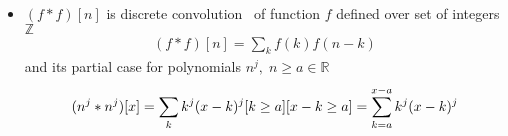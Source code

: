 \begin{itemize}
    \item $(f\ast f)[n]$ is discrete convolution~\cite{damelin_discrete_convolution} of function $f$ defined over set of integers $\mathbb{Z}$
    \begin{align*}
    (f\ast f)[n]
        = \sum_{k} f(k) f(n-k)
    \end{align*}
    and its partial case for polynomials $n^j, \; n\geq a \in \mathbb{R}$
    \begin{align*}
        (n \sp{j} \ast n \sp{j}) [x] =\sum_{k} k^j (x-k)^j [k\geq a][x-k\geq a] =\sum_{k=a}^{x-a} k^j (x-k)^j
    \end{align*}
\end{itemize}
